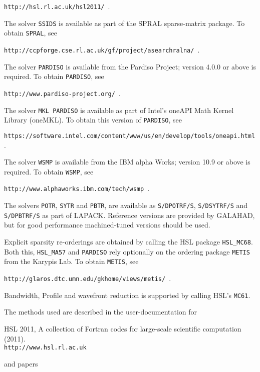 \documentclass{galahad}
\begin{document}
{\tt http://hsl.rl.ac.uk/hsl2011/ }.

\noindent
The solver {\tt SSIDS} is available as part of the SPRAL sparse-matrix package.
To obtain {\tt SPRAL}, see

{\tt http://ccpforge.cse.rl.ac.uk/gf/project/asearchralna/ }.

\noindent
The solver {\tt PARDISO} is available from the Pardiso Project;
version 4.0.0 or above is required.
To obtain {\tt PARDISO}, see

{\tt http://www.pardiso-project.org/ }.

\noindent
The solver {\tt MKL PARDISO} is available as part of Intel's oneAPI Math Kernel
Library (oneMKL).
To obtain this version of {\tt PARDISO}, see

{\tt https://software.intel.com/content/www/us/en/develop/tools/oneapi.html }.

\noindent
The solver {\tt WSMP} is available from the IBM alpha Works;
version 10.9 or above is required.
To obtain {\tt WSMP}, see

{\tt http://www.alphaworks.ibm.com/tech/wsmp }.

\noindent
The solvers {\tt POTR}, {\tt SYTR} and {\tt PBTR},
are available as
{\tt S/DPOTRF/S},
{\tt S/DSYTRF/S} and {\tt S/DPBTRF/S}
as part of LAPACK. Reference versions
are provided by GALAHAD, but for good performance
machined-tuned versions should be used.

\noindent
Explicit sparsity re-orderings are obtained by calling the HSL package
{\tt HSL\_MC68}.
Both this, {\tt HSL\_MA57} and {\tt PARDISO} rely optionally
on the ordering package {\tt METIS} from the Karypis Lab. To obtain
{\tt METIS}, see

{\tt http://glaros.dtc.umn.edu/gkhome/views/metis/ }.

\noindent
Bandwidth, Profile and wavefront reduction is supported by
calling HSL's {\tt MC61}.

\vspace*{1mm}

\galreferences
\vspace*{1mm}

\noindent
The methods used are described in the user-documentation for
\vspace*{1mm}

\noindent
HSL 2011, A collection of {F}ortran codes for large-scale scientific
 computation (2011). \\
 {\tt http://www.hsl.rl.ac.uk}

\noindent
and papers
\end{document}
